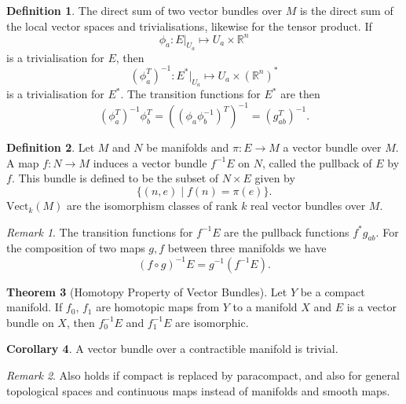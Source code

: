 \documentclass[twocolumn]{article}
\theoremstyle{definition}
\newtheorem{definition}{Definition}[section]
\newtheorem{theorem}[definition]{Theorem}
\newtheorem{corollary}[definition]{Corollary}
\theoremstyle{remark}
\newtheorem*{remark}{Remark}
\begin{document}
\begin{definition}
    The direct sum of two vector bundles over $M$ is the direct sum of the local vector spaces and trivialisations,
    likewise for the tensor product. If
    \begin{equation}
        \phi_a : E|_{U_a} \mapsto U_a \times \mathbb{R}^n
    \end{equation}
    is a trivialisation for $E$, then
    \begin{equation}
        (\phi_a^T)^{-1} : E^*|_{U_a} \mapsto U_a \times \left(\mathbb{R}^n\right)^*
    \end{equation}
    is a trivialisation for $E^*$. The transition functions for $E^*$ are then
    \begin{equation}
        (\phi_a^T)^{-1} \phi_b^T = ((\phi_a \phi_b^{-1})^T)^{-1} = (g^T_{ab})^{-1}.
    \end{equation}
\end{definition}
\begin{definition}
    Let $M$ and $N$ be manifolds and $\pi: E \rightarrow M$ a vector bundle over $M$.
    A map $f: N \rightarrow M$ induces a vector bundle $f^{-1}E$ on $N$, called the pullback of $E$ by $f$.
    This bundle is defined to be the subset of $N \times E$ given by
    \begin{equation}
        \{ (n, e) \mid  f(n) = \pi(e) \}.
    \end{equation}
    $\text{Vect}_k(M)$ are the isomorphism classes of rank $k$ real vector bundles over $M$.
\end{definition}
\begin{remark}
    The transition functions for $f^{-1}E$ are the pullback functions $f^*g_{ab}$.
    For the composition of two maps $g, f$ between three manifolds we have
    \begin{equation}
        (f \circ g)^{-1} E = g^{-1}(f^{-1}E).
    \end{equation}
\end{remark}
\begin{theorem}[Homotopy Property of Vector Bundles]
    Let $Y$ be a compact manifold. If $f_0$, $f_1$ are homotopic maps from $Y$ to a manifold $X$ and $E$ is a vector bundle on $X$,
    then $f_0^{-1}E$ and $f_1^{-1}E$ are isomorphic.
\end{theorem}
\begin{corollary}
    A vector bundle over a contractible manifold is trivial.
\end{corollary}
\begin{remark}
    Also holds if compact is replaced by paracompact, and also for general topological spaces and continuous maps instead of manifolds and smooth maps.
\end{remark}
\end{document}
